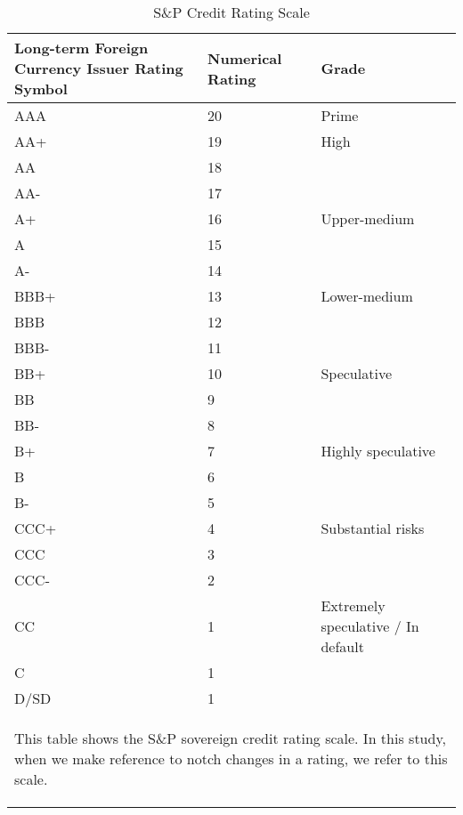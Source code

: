 
\begin{table}[tb!]
\footnotesize
\centering
\caption{S\&P Credit Rating Scale}
\label{tab:tab5}
\begin{tabularx}{\textwidth}{p{4cm} p{3cm} p{4cm} }
\hline
Long-term Foreign Currency Issuer Rating Symbol & Numerical Rating & Grade \\
\hline
AAA & 20 & Prime \\
AA+ & 19 & High \\
AA & 18 & \\
AA- & 17 & \\
A+ & 16 & Upper-medium \\
A & 15 & \\
A- & 14 & \\
BBB+ & 13 & Lower-medium \\
BBB & 12 & \\
BBB- & 11 & \\
BB+ & 10 & Speculative \\
BB & 9 & \\
BB- & 8 & \\
B+ & 7 & Highly speculative \\
B & 6 & \\
B- & 5 & \\
CCC+ & 4 & Substantial risks \\
CCC & 3 & \\
CCC- & 2 & \\
CC & 1 & Extremely speculative / In default \\
C & 1 & \\
D/SD & 1 & \\
\hline
\multicolumn{3}{p{\textwidth}}{\begin{footnotesize}This table shows the S\&P sovereign credit rating scale. In this study, when we make reference to notch changes in a rating, we refer to this scale.
\end{footnotesize}
}
\end{tabularx}
\end{table}
